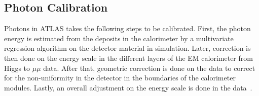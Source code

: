 \subsection{Photon Calibration}
Photons in ATLAS takes the following steps to be calibrated. 
First, the photon energy is estimated from the deposits in the calorimeter by a multivariate regression algorithm on the detector material in simulation. Later, correction is then done on the energy scale in the different layers of the EM calorimeter from Higgs to $\mu \mu$ data. After that, geometric correction is done on the data to correct for the non-uniformity in the detector in the boundaries of the calorimeter modules. Lastly, an overall adjustment on the energy scale is done in the data~\cite{gammaCalibration2019}.

